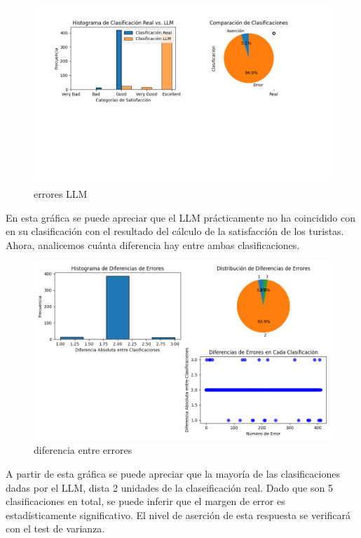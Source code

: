 \documentclass[12pt,a4paper]{article} \usepackage[spanish]{babel} \usepackage{graphicx} \usepackage{amsmath} \usepackage{amsfonts} \usepackage{amssymb} \usepackage{float} \usepackage{geometry}
\begin{document}
\begin{figure}[H] \centering \includegraphics[width=\textwidth]{LLM classif vs real satisfaction} \caption{errores LLM} \label{fig:etiqueta} \end{figure}
En esta gráfica se puede apreciar que el LLM prácticamente no ha coincidido con en su clasificación con el resultado del cálculo de la satisfacción de los turistas. Ahora, analicemos cuánta diferencia hay entre ambas clasificaciones.
\begin{figure}[H] \centering \includegraphics[width=\textwidth]{Diferencia de errores} \caption{diferencia entre errores} \label{fig:etiqueta}\end{figure}
A partir de esta gráfica se puede apreciar que la mayoría de las clasificaciones dadas por el LLM, dista 2 unidades de la claseificación real. Dado que son 5 clasificaciones en total, se puede inferir que el margen de error es estadísticamente significativo. El nivel de aserción de esta respuesta se verificará con el test de varianza.
\end{document}
